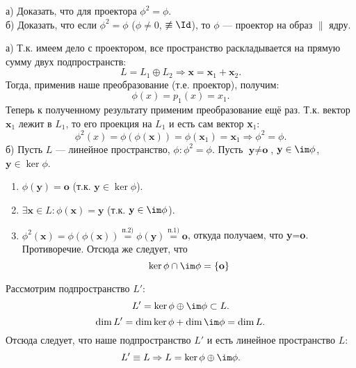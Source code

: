 \begin{prim}
	а) Доказать, что для проектора $\phi^2=\phi$.\\
	б) Доказать, что если $\phi^2=\phi$ ($\phi\neq0$, $\not\equiv\Id$), то $\phi$ --- проектор на образ $\parallel$ ядру.
\end{prim}
а) Т.к. имеем дело с проектором, все пространство раскладывается на прямую сумму двух подпространств:
$$
L=L_1\oplus L_2\Rightarrow \textbf{x}=\textbf{x$_1$}+\textbf{x$_2$}.
$$
Тогда, применив наше преобразование (т.е. проектор), получим:
$$
\phi(x)=p_1(x)=x_1.
$$
Теперь к полученному результату применим преобразование ещё раз. Т.к. вектор $\textbf{x$_1$}$ лежит в $L_1$, то его проекция на $L_1$ и есть сам вектор \textbf{x$_1$}:
$$
\phi^2(x)=\phi(\phi(\textbf{x}))=\phi(\textbf{x$_1$})=\textbf{x$_1$} \Rightarrow \boxed{\phi^2=\phi}.
$$
б) Пусть $L$ --- линейное пространство, $\phi: \phi^2=\phi$. Пусть $\textbf{y}\neq \textbf{o}$, $\textbf{y} \in \im\phi$, $\textbf{y}\in\ker\phi$.
\begin{enumerate}
	\item $\phi(\textbf{y}) = \textbf{o}$ (т.к. $\textbf{y}\in\ker\phi$).
	\item $\exists \textbf{x}\in L: \phi(\textbf{x}) = \textbf{y}$ (т.к. $\textbf{y}\in\im\phi$).
	\item $\phi^2(\textbf{x})=\phi(\phi(\textbf{x}))\overset{\text{п.2)}}=\phi(\textbf{y})\overset{\text{п.1)}}{=}\textbf{o}$, откуда получаем, что \textbf{y}=\textbf{o}. Противоречие. Отсюда же следует, что
	$$
	\ker\phi\cap\im\phi=\{\textbf{o}\}
	$$
\end{enumerate}
Рассмотрим подпространство $L'$:
$$
L'=\ker\phi\oplus\im\phi\subset L.
$$
$$
\dim L'=\dim\ker\phi+\dim\im\phi=\dim L.
$$
Отсюда следует, что наше подпространство $L'$ и есть линейное пространство $L$:
$$
L'\equiv L \Rightarrow L=\ker\phi\oplus\im\phi.
$$
